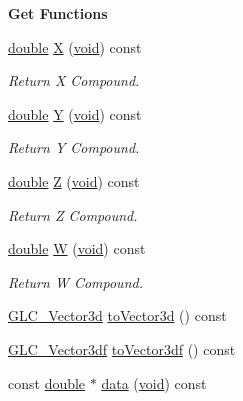 \begin{Indent}{\bf Get Functions}\par
\begin{DoxyCompactItemize}
\item 
\hyperlink{_super_l_u_support_8h_a8956b2b9f49bf918deed98379d159ca7}{double} \hyperlink{class_g_l_c___vector4d_a31dbf673389094ba952f0c635c8bc0c3}{X} (\hyperlink{group___u_a_v_objects_plugin_ga444cf2ff3f0ecbe028adce838d373f5c}{void}) const 
\begin{DoxyCompactList}\small\item\em Return X Compound. \end{DoxyCompactList}\item 
\hyperlink{_super_l_u_support_8h_a8956b2b9f49bf918deed98379d159ca7}{double} \hyperlink{class_g_l_c___vector4d_a07bff29b6721bb31fba809bd08142027}{Y} (\hyperlink{group___u_a_v_objects_plugin_ga444cf2ff3f0ecbe028adce838d373f5c}{void}) const 
\begin{DoxyCompactList}\small\item\em Return Y Compound. \end{DoxyCompactList}\item 
\hyperlink{_super_l_u_support_8h_a8956b2b9f49bf918deed98379d159ca7}{double} \hyperlink{class_g_l_c___vector4d_acde0d46796e161c2997ed0867246d42e}{Z} (\hyperlink{group___u_a_v_objects_plugin_ga444cf2ff3f0ecbe028adce838d373f5c}{void}) const 
\begin{DoxyCompactList}\small\item\em Return Z Compound. \end{DoxyCompactList}\item 
\hyperlink{_super_l_u_support_8h_a8956b2b9f49bf918deed98379d159ca7}{double} \hyperlink{class_g_l_c___vector4d_aeda80abff766138e1d0735f0ebf68376}{W} (\hyperlink{group___u_a_v_objects_plugin_ga444cf2ff3f0ecbe028adce838d373f5c}{void}) const 
\begin{DoxyCompactList}\small\item\em Return W Compound. \end{DoxyCompactList}\item 
\hyperlink{class_g_l_c___vector3d}{G\-L\-C\-\_\-\-Vector3d} \hyperlink{class_g_l_c___vector4d_a5b2ec3c4b18cf8b411f1a914cd381550}{to\-Vector3d} () const 
\item 
\hyperlink{class_g_l_c___vector3df}{G\-L\-C\-\_\-\-Vector3df} \hyperlink{class_g_l_c___vector4d_a017749f07b00ce9cf763eb7c899c1513}{to\-Vector3df} () const 
\item 
const \hyperlink{_super_l_u_support_8h_a8956b2b9f49bf918deed98379d159ca7}{double} $\ast$ \hyperlink{class_g_l_c___vector4d_a161b6deed2802f7dbd27adf89c3455ef}{data} (\hyperlink{group___u_a_v_objects_plugin_ga444cf2ff3f0ecbe028adce838d373f5c}{void}) const 

\end{DoxyCompactItemize}
\end{Indent}
